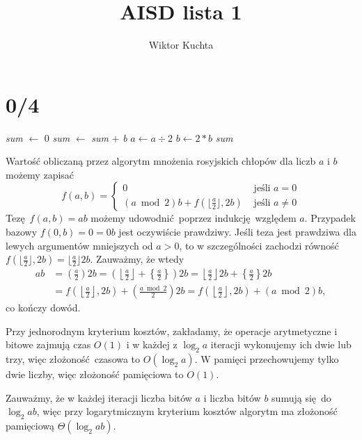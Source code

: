 \documentclass[a4paper, 12pt]{article}
\title{AISD lista 1}
\author{Wiktor Kuchta}
\date{\vspace{-4ex}}
\newcommand{\+}{\enspace}
\begin{document}
\maketitle

\section*{0/4}

\begin{algorithm}
	\begin{algorithmic}
			\State \textit{sum} $←$ 0
					\State \textit{sum} $←$ \textit{sum} $+$ \textit{b}
				\EndIf
				\State $a ← a \div 2$
				\State $b ← 2*b$
			\EndWhile
			\State \Return \textit{sum}
		\EndProcedure
	\end{algorithmic}
\end{algorithm}

Wartość obliczaną przez algorytm mnożenia rosyjskich chłopów dla liczb
$a$ i $b$
możemy zapisać
$$f(a,b) =
\begin{cases}
	0 & \text{ jeśli }a = 0 \\
	(a \bmod 2)b + f(\lfloor\frac{a}{2}\rfloor, 2b) & \text{ jeśli }a ≠ 0
\end{cases}
$$
Tezę $f(a,b) = ab$ możemy udowodnić poprzez indukcję względem $a$.
Przypadek bazowy $f(0,b) = 0 = 0b$ jest oczywiście prawdziwy.
Jeśli teza jest prawdziwa dla lewych argumentów mniejszych od $a>0$,
to w szczególności zachodzi równość $f(\lfloor\frac{a}{2}\rfloor, 2b) = \lfloor\frac{a}{2}\rfloor 2b.$
Zauważmy, że wtedy
\begin{align*}
ab
&= \left(\frac{a}{2}\right)2b
= \left(\left\lfloor\frac{a}{2}\right\rfloor + \left\{\frac{a}{2}\right\}\right)2b
= \left\lfloor\frac{a}{2}\right\rfloor2b + \left\{\frac{a}{2}\right\}2b \\
&= f\left(\left\lfloor\frac{a}{2}\right\rfloor,2b\right) + \left(\frac{a \bmod 2}{2}\right)2b
= f\left(\left\lfloor\frac{a}{2}\right\rfloor,2b\right) + (a \bmod 2)b,
\end{align*}
co kończy dowód.

Przy jednorodnym kryterium kosztów, zakładamy, że operacje arytmetyczne i
bitowe zajmują czas $O(1)$ i w każdej z
$\log_2 a$ iteracji wykonujemy ich dwie lub trzy, więc złożoność czasowa to
$O(\log_2 a)$.
W pamięci przechowujemy tylko dwie liczby, więc złożoność pamięciowa to $O(1)$.

Zauważmy, że w każdej iteracji liczba bitów $a$ i liczba bitów $b$
sumują się do $\log_2 ab$, więc przy logarytmicznym kryterium kosztów
algorytm ma złożoność pamięciową $Θ(\log_2 ab)$.
\end{document}

